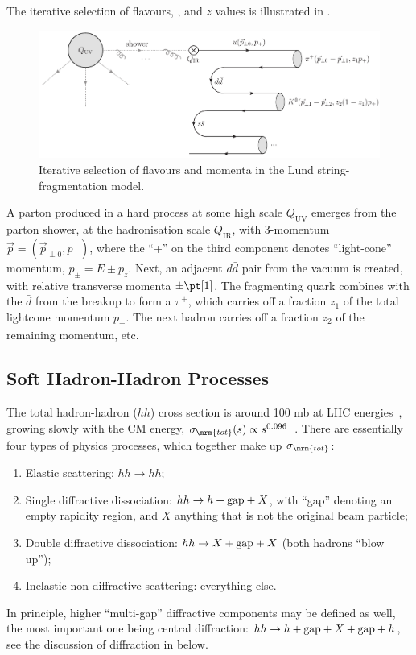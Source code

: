 The iterative selection of flavours, \pt,
and $z$ values is illustrated in .
\begin{figure}[tp]
\centering
\includegraphics*[scale=0.65]{frag.pdf}
\caption{Iterative selection of flavours and
  momenta in the Lund string-fragmentation model. \label{fig:iterative}}
\end{figure}
A parton produced in a hard process at some high scale
$Q_{\mathrm{UV}}$ emerges from 
  the parton shower, at the hadronisation scale $Q_{\mathrm{IR}}$, 
  with 3-momentum $\vec{p}=(\vec{p}_{\perp 0},p_+)$, where the ``+'' on the third
  component denotes ``light-cone'' momentum, $p_\pm = E\pm p_z$. 
  Next, an adjacent $d\bar{d}$ pair from the
  vacuum is created, with relative transverse momenta $\pm\pt[1]$. 
  The fragmenting quark combines with the $\bar{d}$ from the breakup
  to form a $\pi^+$, which carries off a fraction $z_1$ of the total
  lightcone momentum $p_+$. The next hadron carries off a fraction
  $z_2$ of the remaining momentum, etc. 

\subsection{Soft Hadron-Hadron Processes \label{sec:soft-processes}}
%
%
%
%
%
The total hadron-hadron ($hh$) cross section is around 100 mb at LHC
energies~\cite{Antchev:2013paa}, growing slowly with the CM energy, 
$\sigma_\mrm{tot}(s) \propto s^{0.096}$~\cite{Donnachie:2013xia}. 
There are essentially four types of physics processes,
which together make up $\sigma_\mrm{tot}$:
\begin{enumerate}
\item Elastic scattering:  $hh\to hh$;
\item Single diffractive dissociation: $hh\to h+{\rm gap}+X$, with
``gap'' denoting an empty rapidity region, and $X$ anything that is
not the original beam particle;
\item Double diffractive dissociation: $hh\to
X+{\rm gap}+X$ (both hadrons ``blow up'');
\item Inelastic non-diffractive scattering: everything else.
\end{enumerate}
In principle, higher ``multi-gap'' diffractive components may be
defined as well, the most important one being central diffraction: $hh\to
h+{\rm gap}+X+{\rm gap}+h$, see the discussion of diffraction 
in  below. 

